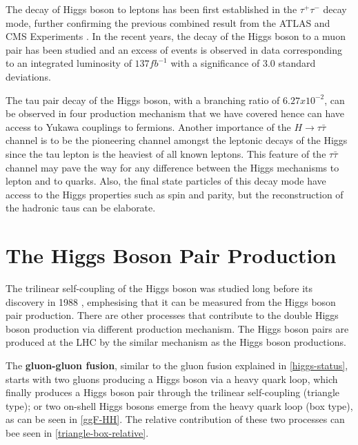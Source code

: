The decay of Higgs boson to leptons has been first established in the $\tau^+\tau^-$ decay mode\cite{CMS-PAS-HIG-16-043}, further confirming the previous combined result from the ATLAS and CMS Experiments \cite{Aad2016}. In the recent years, the decay of the Higgs boson to a muon pair has been studied and an excess of events is observed in data corresponding to an integrated luminosity of $137 fb^{-1}$ with a significance of 3.0 standard deviations\cite{CMS-PAS-HIG-19-006}.

The tau pair decay of the Higgs boson, with a branching ratio of $6.27x10^{-2}$, can be observed in four production mechanism that we have covered hence can  have access to Yukawa couplings to fermions. Another importance of the $H\rightarrow\tau\bar\tau$ channel is to be the pioneering channel amongst the leptonic decays of the Higgs since the tau lepton is the heaviest of all known leptons. This feature of the $\tau\bar\tau$ channel may pave the way for any difference between the Higgs mechanisms to lepton and to quarks. Also, the final state particles of this decay mode have access to the Higgs properties such as spin and parity, but the reconstruction of the hadronic taus can be elaborate. 

\section{The Higgs Boson Pair Production}

The trilinear self-coupling of the Higgs boson was studied long before its discovery in 1988 \cite{GLOVER1988282}, emphesising that it can be measured from the Higgs boson pair production. There are other processes that contribute to the double Higgs boson production via different production mechanism. The Higgs boson pairs are produced at the LHC by the similar mechanism as the Higgs boson productions. 

The \textbf{gluon-gluon fusion}, similar to the gluon fusion explained in \autoref{higgs-status}, starts with two gluons producing a Higgs boson via a heavy quark loop, which finally produces a Higgs boson pair through the trilinear self-coupling (triangle type); or two on-shell Higgs bosons emerge from the heavy quark loop (box type), as can be seen in \autoref{ggF-HH}. The relative contribution of these two processes can bee seen in \autoref{triangle-box-relative}.

